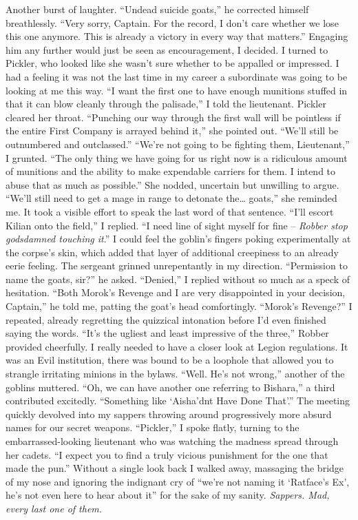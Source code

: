 \documentclass[12pt, openany]{book}
\begin{document}
Another burst of laughter. “Undead suicide goats,” he corrected himself breathlessly. “Very sorry, Captain. For the record, I don’t care whether we lose this one anymore. This is already a victory in every way that matters.”
Engaging him any further would just be seen as encouragement, I decided. I turned to Pickler, who looked like she wasn’t sure whether to be appalled or impressed. I had a feeling it was not the last time in my career a subordinate was going to be looking at me this way.
“I want the first one to have enough munitions stuffed in that it can blow cleanly through the palisade,” I told the lieutenant.
Pickler cleared her throat. “Punching our way through the first wall will be pointless if the entire First Company is arrayed behind it,” she pointed out. “We’ll still be outnumbered and outclassed.”
“We’re not going to be fighting them, Lieutenant,” I grunted. “The only thing we have going for us right now is a ridiculous amount of munitions and the ability to make expendable carriers for them. I intend to abuse that as much as possible.”
She nodded, uncertain but unwilling to argue.
“We’ll still need to get a mage in range to detonate the… goats,” she reminded me.
It took a visible effort to speak the last word of that sentence.
“I’ll escort Kilian onto the field,” I replied. “I need line of sight myself for fine – \textit{Robber stop godsdamned touching it}.”
I could feel the goblin’s fingers poking experimentally at the corpse’s skin, which added that layer of additional creepiness to an already eerie feeling. The sergeant grinned unrepentantly in my direction.
“Permission to name the goats, sir?” he asked.
“Denied,” I replied without so much as a speck of hesitation.
“Both Morok’s Revenge and I are very disappointed in your decision, Captain,” he told me, patting the goat’s head comfortingly.
“Morok’s Revenge?” I repeated, already regretting the quizzical intonation before I’d even finished saying the words.
“It’s the ugliest and least impressive of the three,” Robber provided cheerfully.
I really needed to have a closer look at Legion regulations. It was an Evil institution, there was bound to be a loophole that allowed you to strangle irritating minions in the bylaws.
“Well. He’s not wrong,” another of the goblins muttered.
“Oh, we can have another one referring to Bishara,” a third contributed excitedly. “Something like ‘Aisha’dnt Have Done That’.”
The meeting quickly devolved into my sappers throwing around progressively more absurd names for our secret weapons.
“Pickler,” I spoke flatly, turning to the embarrassed-looking lieutenant who was watching the madness spread through her cadets. “I expect you to find a truly vicious punishment for the one that made the pun.”
Without a single look back I walked away, massaging the bridge of my nose and ignoring the indignant cry of “we’re not naming it ‘Ratface’s Ex’, he’s not even here to hear about it” for the sake of my sanity. \textit{Sappers. Mad, every last one of them.}
\end{document}
